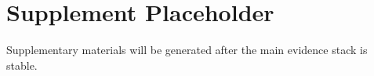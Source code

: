 \documentclass{article}
\begin{document}
\section*{Supplement Placeholder}
Supplementary materials will be generated after the main evidence stack is stable.
\end{document}

